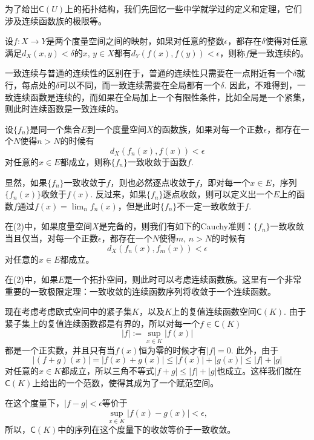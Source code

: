 \begin{para}
为了给出$\mathsf{C}(U)$上的拓扑结构，我们先回忆一些中学就学过的定义和定理，它们涉及连续函数族的极限等。
\begin{compactenum}[(1)]
\item 设$f:X\to Y$是两个度量空间之间的映射，如果对任意的整数$\epsilon$，都存在$\delta$使得对任意满足$d_X(x,y)<\delta$的$x$, $y\in X$都有$d_Y(f(x),f(y))<\epsilon$，则称$f$是一致连续的。

一致连续与普通的连续性的区别在于，普通的连续性只需要在一点附近有一个$\delta$就行，每点处的$\delta$可以不同，而一致连续需要在全局都有一个$\delta$. 因此，不难得到，一致连续函数是连续的，而如果在全局加上一个有限性条件，比如全局是一个紧集，则此时连续函数是一致连续的。

\item 设$\{f_n\}$是同一个集合$E$到一个度量空间$X$的函数族，如果对每一个正数$\epsilon$，都存在一个$N$使得$n>N$的时候有
\[
	d_X(f_n(x),f(x))< \epsilon
\]
对任意的$x\in E$都成立，则称$\{f_n\}$一致收敛于函数$f$. 

显然，如果$\{f_n\}$一致收敛于$f$，则也必然逐点收敛于$f$，即对每一个$x\in E$，序列$\{f_n(x)\}$收敛于$f(x)$. 反过来，如果$\{f_n\}$逐点收敛，则可以定义出一个$E$上的函数$f$通过$f(x)=\lim_{n}f_n(x)$，但是此时$\{f_n\}$不一定一致收敛于$f$.

\item 在(2)中，如果度量空间$X$是完备的，则我们有如下的Cauchy准则：$\{f_n\}$一致收敛当且仅当，对每一个正数$\epsilon$，都存在一个$N$使得$m$, $n>N$的时候有
\[
	d_X(f_n(x),f_m(x))< \epsilon
\]
对任意的$x\in E$都成立。

\item 在(2)中，如果$E$是一个拓扑空间，则此时可以考虑连续函数族。这里有一个非常重要的一致极限定理：一致收敛的连续函数序列将收敛于一个连续函数。
\end{compactenum}
\end{para}

\begin{para}
现在考虑考虑欧式空间中的紧子集$K$，以及$K$上的复值连续函数空间$\mathsf{C}(K)$. 由于紧子集上的复值连续函数都是有界的，所以对每一个$f\in \mathsf{C}(K)$
\[
	|f|:=\sup_{x\in K}|f(x)|
\]
都是一个正实数，并且只有当$f(x)$恒为零的时候才有$|f|=0$. 此外，由于
\[
	|(f+g)(x)|=|f(x)+g(x)|\leq |f(x)|+|g(x)|\leq |f|+|g|
\]
对任意的$x\in K$都成立，所以三角不等式$|f+g|\leq |f|+|g|$也成立。这样我们就在$\mathsf{C}(K)$上给出的一个范数，使得其成为了一个赋范空间。

在这个度量下，$|f-g|< \epsilon$等价于
\[
	\sup_{x\in K}|f(x)-g(x)|<\epsilon,
\]
所以，$\mathsf{C}(K)$中的序列在这个度量下的收敛等价于一致收敛。
\end{para}


